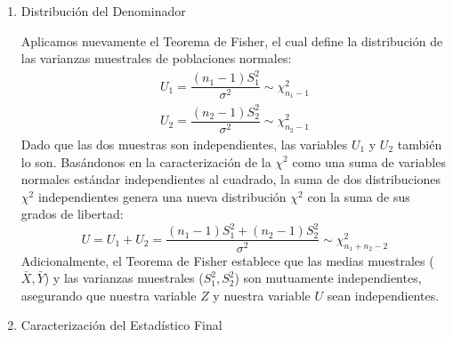\begin{enumerate}[label=\color{red}\textbf{\arabic*)}]
\begin{enumerate}[label=\arabic*)]
		            Al ser una combinación lineal de normales, $W$ sigue una distribución normal. Si la estandarizamos, obtenemos una variable normal estándar $Z$: \[
			            Z=\dfrac{W}{\sqrt{\mathrm{Var}(W)} }=\dfrac{\alpha(\bar{X}-\mu_1)+\beta(\bar{Y}-\mu_2)}{\sigma \sqrt{\frac{\alpha^2}{n_1} +\frac{\beta^2}{n_2} } }\sim \mathcal{N}(0,1)
		            \]
		      \item Distribución del Denominador

		            Aplicamos nuevamente el Teorema de Fisher, el cual define la distribución de las varianzas muestrales de poblaciones normales: \[
			            \begin{array}{c}
				            U_1=\dfrac{(n_1-1)S_1^2}{\sigma^2}\sim \chi_{n_1-1}^2 \\
				            U_2=\dfrac{(n_2-1)S_2^2}{\sigma^2}\sim \chi_{n_2-1}^2
			            \end{array}
		            \]
		            Dado que las dos muestras son independientes, las variables $U_1$ y $U_2$ también lo son. Basándonos en la caracterización de la $\chi^2$ como una suma de variables normales estándar independientes al cuadrado, la suma de dos distribuciones $\chi^2$ independientes genera una nueva distribución $\chi^2$ con la suma de sus grados de libertad:
		            \[
			            U=U_1+U_2=\dfrac{(n_1-1)S_1^2+(n_2-1)S_2^2}{\sigma^2}\sim \chi_{n_1+n_2-2}^2
		            \]
		            Adicionalmente, el Teorema de Fisher establece que las medias muestrales ($\bar{X},\bar{Y}$) y las varianzas muestrales ($S_1^2,S_2^2$) son mutuamente independientes, asegurando que nuestra variable $Z$ y nuestra variable $U$ sean independientes.
		      \item Caracterización del Estadístico Final


\end{enumerate}
\end{enumerate}
